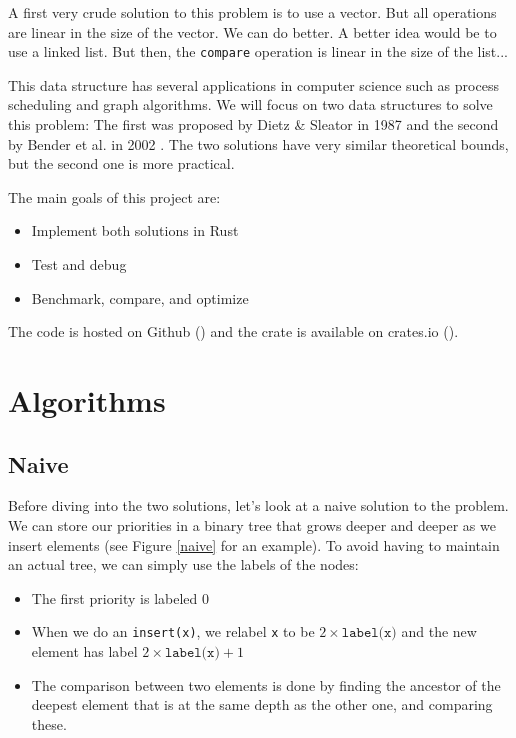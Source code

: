 \documentclass[12pt]{article}
\begin{document}
A first very crude solution to this problem is to use a vector. But all operations are linear in the size of the vector. We can do better.
A better idea would be to use a linked list. But then, the \texttt{compare} operation is linear in the size of the list...

This data structure has several applications in computer science such as process scheduling and graph algorithms.
We will focus on two data structures to solve this problem: The first was proposed by Dietz \& Sleator in 1987 \cite{10.1145/28395.28434} and the second by Bender et al. in 2002 \cite{10.5555/647912.740822}.
The two solutions have very similar theoretical bounds, but the second one is more practical.

The main goals of this project are:
\begin{itemize}
  \item Implement both solutions in Rust
  \item Test and debug
  \item Benchmark, compare, and optimize
\end{itemize}

The code is hosted on Github (\url{}) and the crate is available on crates.io (\url{}).

\newpage
\section{Algorithms}

\subsection{Naive}

Before diving into the two solutions, let's look at a naive solution to the problem.
We can store our priorities in a binary tree that grows deeper and deeper as we insert elements (see Figure \ref{naive} for an example).
To avoid having to maintain an actual tree, we can simply use the labels of the nodes:
\begin{itemize}
  \item The first priority is labeled 0
  \item When we do an \texttt{insert(x)}, we relabel \texttt{x} to be $2 \times \texttt{label(x)}$ and the new element has label $2 \times \texttt{label(x)} + 1$
  \item The comparison between two elements is done by finding the ancestor of the deepest element that is at the same depth as the other one, and comparing these.
\end{itemize}
\end{document}
